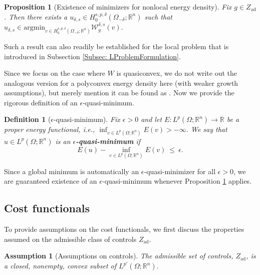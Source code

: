 \documentclass[11pt, reqno]{amsart}   	%
\theoremstyle{plain}
\numberwithin{equation}{section}
\newtheorem{assumption}[thm]{Assumption}
\newtheorem{definition}[thm]{Definition}
\newtheorem{proposition}[thm]{Proposition}
\def\de{\delta}
\def\ep{\epsilon}
\def\Om{\Omega}
\def\R{\mathbb{R}}
\def\argmin{\text{argmin}}
\begin{document}
\begin{proposition}[Existence of minimizers for nonlocal energy density]\label{Prop: QuasiConvexityEnergy}
    Fix $g \in Z_{\text{ad}}$. Then there exists a $u_{\de, s} \in H^{s, p, \de}_0(\Om_{-\de}; \R^n)$ such that $u_{\de, s} \in \argmin_{v \in H^{s, p, \de}_0(\Om_{-\de}; \R^n)}\mathcal{W}^{\de, s}_g(v)$.
\end{proposition}

Such a result can also readily be established for the local problem that is introduced in Subsection \ref{Subsec: LProblemFormulation}.

Since we focus on the case where $W$ is quasiconvex, we do not write out the analogous version for a polyconvex energy density here (with weaker growth assumptions), but merely mention it can be found as \cite[Theorem 6.1]{bellido2023minimizers}. Now we provide the rigorous definition of an $\ep$-quasi-minimum. 

\begin{definition}[$\ep$-quasi-minimum]\label{Def: epQuasiMin}
    Fix $\ep > 0$ and let $E: L^p(\Om; \R^n) \rightarrow \R$ be a proper energy functional, i.e., $\inf_{v \in L^p(\Om; \R^n)}E(v) > -\infty$. We say that $u \in L^p(\Om; \R^n)$ is an \textbf{$\ep$-quasi-minimum} if
    \begin{equation}\label{Eq: epQuasiMin}
        E(u) - \inf_{v \in L^p(\Om; \R^n)}E(v) \ \leq \ \ep.
    \end{equation}
\end{definition}

Since a global minimum is automatically an $\ep$-quasi-minimizer for all $\ep > 0$, we are guaranteed existence of an $\ep$-quasi-minimum whenever Proposition \ref{Prop: QuasiConvexityEnergy} applies.


\subsection{Cost functionals}\label{Subsec: cost}

To provide assumptions on the cost functionals, we first discuss the properties assumed on the admissible class of controls $Z_{\text{ad}}$.

\begin{assumption}[Assumptions on controls]\label{Assump: Zad}
    The admissible set of controls, $Z_{\text{ad}}$, is a closed, nonempty, convex subset of $L^{p'}(\Om; \R^n)$. 
\end{assumption}
\end{document}
